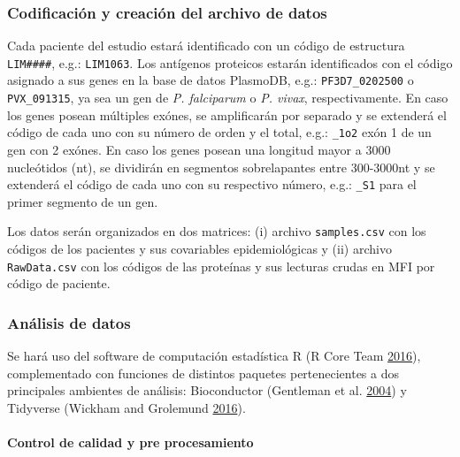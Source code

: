 \documentclass[
  a4paper]{article}
\let\oldparagraph\paragraph
\renewcommand{\paragraph}[1]{\oldparagraph{#1}\mbox{}}
\begin{document}
\hypertarget{codificaciuxf3n-y-creaciuxf3n-del-archivo-de-datos}{%
\subsubsection{Codificación y creación del archivo de
datos}\label{codificaciuxf3n-y-creaciuxf3n-del-archivo-de-datos}}

Cada paciente del estudio estará identificado con un código de
estructura \texttt{LIM\#\#\#\#}, e.g.: \texttt{LIM1063}. Los antígenos
proteicos estarán identificados con el código asignado a sus genes en la
base de datos PlasmoDB, e.g.: \texttt{PF3D7\_0202500} o
\texttt{PVX\_091315}, ya sea un gen de \emph{P. falciparum} o \emph{P.
vivax}, respectivamente. En caso los genes posean múltiples exónes, se
amplificarán por separado y se extenderá el código de cada uno con su
número de orden y el total, e.g.: \texttt{\_1o2} exón 1 de un gen con 2
exónes. En caso los genes posean una longitud mayor a 3000 nucleótidos
(nt), se dividirán en segmentos sobrelapantes entre 300-3000nt y se
extenderá el código de cada uno con su respectivo número, e.g.:
\texttt{\_S1} para el primer segmento de un gen.

Los datos serán organizados en dos matrices: (i) archivo
\texttt{samples.csv} con los códigos de los pacientes y sus covariables
epidemiológicas y (ii) archivo \texttt{RawData.csv} con los códigos de
las proteínas y sus lecturas crudas en MFI por código de paciente.

\hypertarget{anadata}{%
\subsubsection{Análisis de datos}\label{anadata}}

Se hará uso del software de computación estadística R (R Core Team
\protect\hyperlink{ref-R2016}{2016}), complementado con funciones de
distintos paquetes pertenecientes a dos principales ambientes de
análisis: Bioconductor (Gentleman et al.
\protect\hyperlink{ref-bioconductor2004}{2004}) y Tidyverse (Wickham and
Grolemund \protect\hyperlink{ref-wickham2016r4ds}{2016}).

\hypertarget{control-de-calidad-y-pre-procesamiento}{%
\paragraph{Control de calidad y pre
procesamiento}\label{control-de-calidad-y-pre-procesamiento}}
\end{document}
